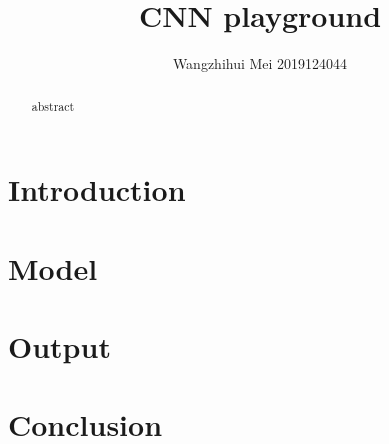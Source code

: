 \documentclass[11pt,en]{elegantpaper}
\title{CNN playground }
\author{Wangzhihui Mei 2019124044}
\institute{CCNU-UOW JI}
\date{}
\begin{document}
\maketitle

\begin{abstract}
	abstract
\end{abstract}

\section{Introduction}

\section{Model}

\section{Output}

\section{Conclusion}


\end{document}
